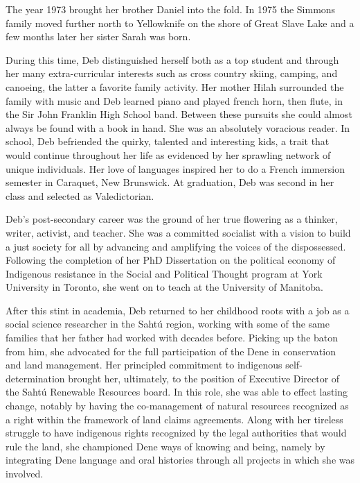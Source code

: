 \documentclass[12pt]{extarticle}
\newcommand\AtPageUpperRight[1]{\AtPageUpperLeft{%
 \put(\LenToUnit{\paperwidth},\LenToUnit{0\paperheight}){#1}%
 }}%
\newcommand\AtPageLowerRight[1]{\AtPageLowerLeft{%
 \put(\LenToUnit{\paperwidth},\LenToUnit{0\paperheight}){#1}%
 }}%
\begin{document}
The year 1973 brought her brother Daniel into the fold. In 1975 the
Simmons family moved further north to Yellowknife on the shore of Great
Slave Lake and a few months later her sister Sarah was born.

\AddToShipoutPictureBG*{%
   \AtPageUpperLeft{\put(18,-72){\pgfornament[width=1.5cm]{41}}}
   \AtPageUpperRight{\put(-61,-72){\pgfornament[width=1.5cm,symmetry=v]{41}}}
   \AtPageLowerLeft{\put(18,60){\pgfornament[width=1.5cm,symmetry=h]{41}}}
   \AtPageLowerRight{\put(-61,60){\pgfornament[width=1.5cm,symmetry=c]{41}}}
}

\vspace*{\fill}

\newpage
{}

\vspace*{\fill}

During this time, Deb distinguished herself both as a top student and
through her many extra-curricular interests such as cross country
skiing, camping, and canoeing, the latter a favorite family activity.
Her mother Hilah surrounded the family with music and Deb learned piano
and played french horn, then flute, in the Sir John Franklin High School
band. Between these pursuits she could almost always be found with a
book in hand. She was an absolutely voracious reader. In school, Deb
befriended the quirky, talented and interesting kids, a trait that would
continue throughout her life as evidenced by her sprawling network of
unique individuals. Her love of languages inspired her to do a French
immersion semester in Caraquet, New Brunswick. At graduation, Deb was
second in her class and selected as Valedictorian.

Deb's post-secondary career was the ground of her true flowering as a
thinker, writer, activist, and teacher. She was a committed socialist
with a vision to build a just society for all by advancing and
amplifying the voices of the dispossessed. Following the completion of
her PhD Dissertation on the political economy of Indigenous resistance
in the Social and Political Thought program at York University in
Toronto, she went on to teach at the University of Manitoba.

After this stint in academia, Deb returned to her childhood roots with a
job as a social science researcher in the Sahtú region, working with
some of the same families that her father had worked with decades
before. Picking up the baton from him, she advocated for the full
participation of the Dene in conservation and land management. Her
principled commitment to indigenous self-determination brought her,
ultimately, to the position of Executive Director of the Sahtú Renewable
Resources board. In this role, she was able to effect lasting change,
notably by having the co-management of natural resources recognized as a
right within the framework of land claims agreements. Along with her
tireless struggle to have indigenous rights recognized by the legal
authorities that would rule the land, she championed Dene ways of
knowing and being, namely by integrating Dene language and oral
histories through all projects in which she was involved.
\end{document}
